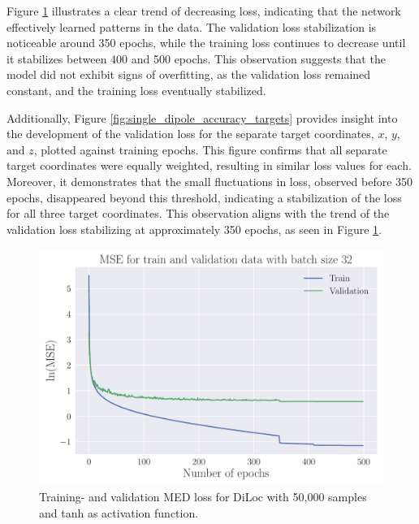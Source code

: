 \documentclass[a4paper, UKenglish, 11pt]{uiomaster}
\begin{document}
Figure \ref{fig:single_dipole_accuracy} illustrates a clear trend of decreasing loss, indicating that the network effectively learned patterns in the data. The validation loss stabilization is noticeable around 350 epochs, while the training loss continues to decrease until it stabilizes between 400 and 500 epochs. This observation suggests that the model did not exhibit signs of overfitting, as the validation loss remained constant, and the training loss eventually stabilized.

Additionally, Figure \ref{fig:single_dipole_accuracy_targets} provides insight into the development of the validation loss for the separate target coordinates, $x$, $y$, and $z$, plotted against training epochs. This figure confirms that all separate target coordinates were equally weighted, resulting in similar loss values for each. Moreover, it demonstrates that the small fluctuations in loss, observed before 350 epochs, disappeared beyond this threshold, indicating a stabilization of the loss for all three target coordinates. This observation aligns with the trend of the validation loss stabilizing at approximately 350 epochs, as seen in Figure \ref{fig:single_dipole_accuracy}.

\begin{figure}[!htb]
    \centering
    \includegraphics[width=\linewidth]{figures/mse_simple_32_0.001_0.35_0.5_0.0_500_(0).pdf}
    \caption{Training- and validation MED loss for DiLoc with 50,000 samples and tanh as activation function.}
    \label{fig:single_dipole_accuracy}
\end{figure}
\end{document}

